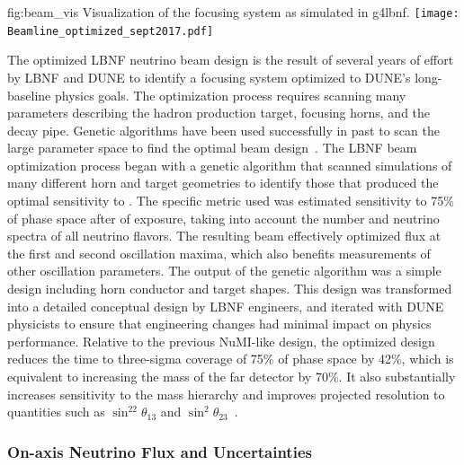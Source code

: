 \begin{dunefigure}{fig:beam_vis}
{Visualization of the focusing system as simulated in g4lbnf.}
    \texttt{[image: Beamline\_optimized\_sept2017.pdf]}\end{dunefigure}


The optimized LBNF neutrino beam design is the result of several years of effort by LBNF and DUNE to identify a focusing system optimized to DUNE's long-baseline physics goals.  The optimization process requires scanning many parameters describing the hadron production target, focusing horns, and the decay pipe. Genetic algorithms have been used successfully in past to scan the large parameter space to find the optimal beam design~\cite{Calviani:2014cxa}. The  LBNF beam optimization process began with a genetic algorithm that scanned simulations of many different horn and target geometries to identify those that produced the optimal sensitivity to .  The specific metric used was estimated sensitivity to 75\% of  phase space after   %
of exposure, taking into account the number and neutrino spectra of all neutrino flavors. The resulting beam effectively optimized flux at the first and second oscillation maxima, which also benefits measurements of other oscillation parameters.  The output of the genetic algorithm was a simple design including horn conductor and target shapes.  This design was transformed into a detailed conceptual design by LBNF engineers, and iterated with DUNE physicists to ensure that engineering changes had minimal impact on physics performance.  Relative to the previous NuMI-like design, the optimized design reduces the time to three-sigma coverage of 75\% of  phase space by 42\%, which is equivalent to increasing the mass of the far detector by 70\%.  It also substantially increases sensitivity to the mass hierarchy and improves projected resolution to quantities such as $\sin^22\theta_{13}$ and $\sin^2\theta_{23}$~\cite{fields_doc_2901}.        

\subsubsection{On-axis Neutrino Flux and Uncertainties}

